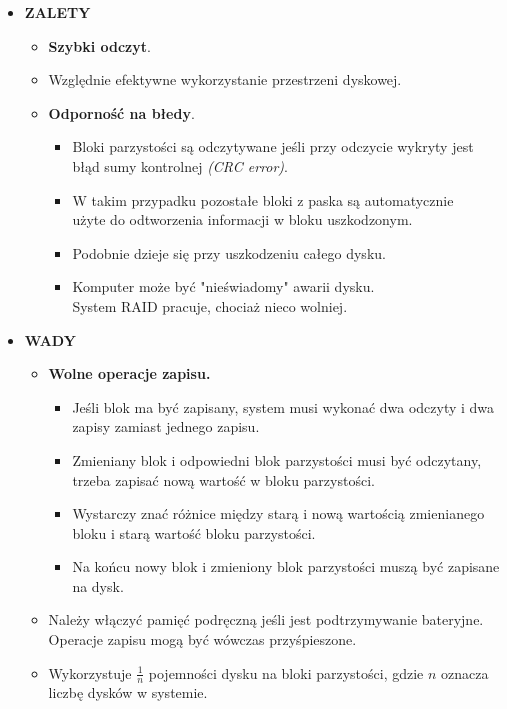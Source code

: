 \begin{itemize}
    \item \textbf{ZALETY}
    \begin{itemize}
        \item \textbf{Szybki odczyt}.
        \item Względnie efektywne wykorzystanie przestrzeni dyskowej.
        \item \textbf{Odporność na błedy}.
        \begin{itemize}
            \item Bloki parzystości są odczytywane jeśli przy odczycie
                  wykryty jest błąd sumy kontrolnej \textit{(CRC error)}.
            \item W takim przypadku pozostałe bloki z paska są automatycznie
                  \\użyte do odtworzenia informacji w bloku uszkodzonym.
            \item Podobnie dzieje się przy uszkodzeniu całego dysku.
            \item Komputer może być "nieświadomy" awarii dysku.\\
                  System RAID pracuje, chociaż nieco wolniej.
        \end{itemize}
    \end{itemize}

    \item \textbf{WADY}
    \begin{itemize}
        \item \textbf{Wolne operacje zapisu.}
        \begin{itemize}
            \item Jeśli blok ma być zapisany, system musi wykonać dwa
                  odczyty i dwa zapisy zamiast jednego zapisu.
            \item Zmieniany blok i odpowiedni blok parzystości musi być
                  odczytany, trzeba zapisać nową wartość w bloku
                  parzystości.
            \item Wystarczy znać różnice między starą i nową wartością
                  zmienianego bloku i starą wartość bloku parzystości.
            \item Na końcu nowy blok i zmieniony blok parzystości muszą
                  być zapisane na dysk.
        \end{itemize}
        \item Należy włączyć pamięć podręczną jeśli jest podtrzymywanie
              bateryjne. Operacje zapisu mogą być wówczas przyśpieszone.
        \item Wykorzystuje $\frac{1}{n}$ pojemności dysku na bloki
              parzystości, gdzie $n$ oznacza liczbę dysków w systemie.
    \end{itemize}


\end{itemize}
